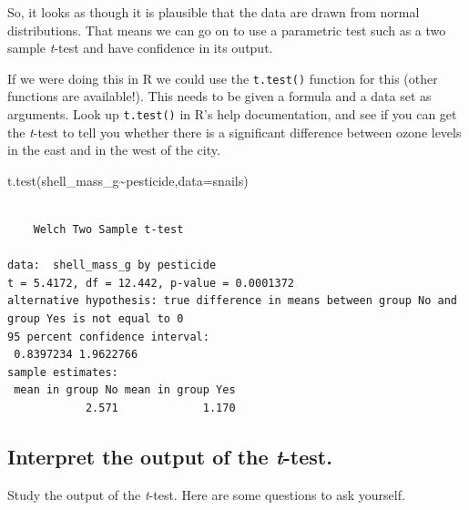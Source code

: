 \documentclass[
  letterpaper,
  DIV=11,
  numbers=noendperiod]{scrreprt}
\newenvironment{Shaded}{\begin{snugshade}}{\end{snugshade}}
\newcommand{\AttributeTok}[1]{\textcolor[rgb]{0.40,0.45,0.13}{#1}}
\newcommand{\FunctionTok}[1]{\textcolor[rgb]{0.28,0.35,0.67}{#1}}
\newcommand{\NormalTok}[1]{\textcolor[rgb]{0.00,0.23,0.31}{#1}}
\newcommand{\SpecialCharTok}[1]{\textcolor[rgb]{0.37,0.37,0.37}{#1}}
\begin{document}
So, it looks as though it is plausible that the data are drawn from
normal distributions. That means we can go on to use a parametric test
such as a two sample \emph{t}-test and have confidence in its output.

If we were doing this in R we could use the \texttt{t.test()} function
for this (other functions are available!). This needs to be given a
formula and a data set as arguments. Look up \texttt{t.test()} in R's
help documentation, and see if you can get the \emph{t}-test to tell you
whether there is a significant difference between ozone levels in the
east and in the west of the city.

\begin{Shaded}
\begin{Highlighting}[]
\FunctionTok{t.test}\NormalTok{(shell\_mass\_g}\SpecialCharTok{\textasciitilde{}}\NormalTok{pesticide,}\AttributeTok{data=}\NormalTok{snails)}
\end{Highlighting}
\end{Shaded}

\begin{verbatim}

    Welch Two Sample t-test

data:  shell_mass_g by pesticide
t = 5.4172, df = 12.442, p-value = 0.0001372
alternative hypothesis: true difference in means between group No and group Yes is not equal to 0
95 percent confidence interval:
 0.8397234 1.9622766
sample estimates:
 mean in group No mean in group Yes 
            2.571             1.170 
\end{verbatim}

\subsection{\texorpdfstring{Interpret the output of the
\emph{t}-test.}{Interpret the output of the t-test.}}\label{interpret-the-output-of-the-t-test.}

Study the output of the \emph{t}-test. Here are some questions to ask
yourself.
\end{document}

